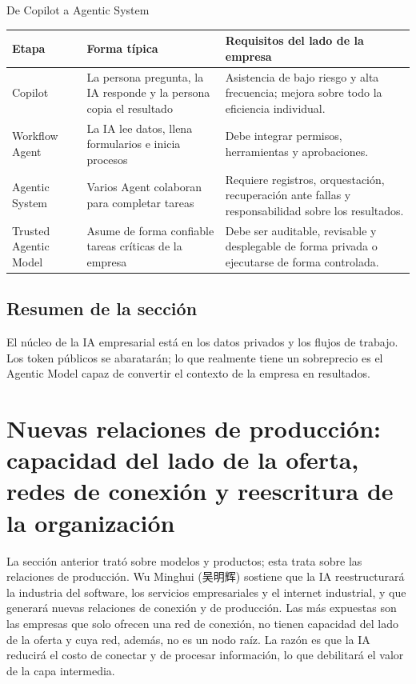 \documentclass[a4paper]{article}
\begin{document}
\begin{knowledgebox}{De Copilot a Agentic System}
\begin{tabularx}{\textwidth}{p{}p{}X}
\toprule
Etapa & Forma típica & Requisitos del lado de la empresa \\
\midrule
Copilot & La persona pregunta, la IA responde y la persona copia el resultado & Asistencia de bajo riesgo y alta frecuencia; mejora sobre todo la eficiencia individual. \\
Workflow Agent & La IA lee datos, llena formularios e inicia procesos & Debe integrar permisos, herramientas y aprobaciones. \\
Agentic System & Varios Agent colaboran para completar tareas & Requiere registros, orquestación, recuperación ante fallas y responsabilidad sobre los resultados. \\
Trusted Agentic Model & Asume de forma confiable tareas críticas de la empresa & Debe ser auditable, revisable y desplegable de forma privada o ejecutarse de forma controlada. \\
\bottomrule
\end{tabularx}
\end{knowledgebox}

\subsection{Resumen de la sección}

El núcleo de la IA empresarial está en los datos privados y los flujos de trabajo. Los token públicos se abaratarán; lo que realmente tiene un sobreprecio es el Agentic Model capaz de convertir el contexto de la empresa en resultados.
\section{Nuevas relaciones de producción: capacidad del lado de la oferta, redes de conexión y reescritura de la organización}

La sección anterior trató sobre modelos y productos; esta trata sobre las relaciones de producción. Wu Minghui (吴明辉) sostiene que la IA reestructurará la industria del software, los servicios empresariales y el internet industrial, y que generará nuevas relaciones de conexión y de producción. Las más expuestas son las empresas que solo ofrecen una red de conexión, no tienen capacidad del lado de la oferta y cuya red, además, no es un nodo raíz. La razón es que la IA reducirá el costo de conectar y de procesar información, lo que debilitará el valor de la capa intermedia.
\end{document}
